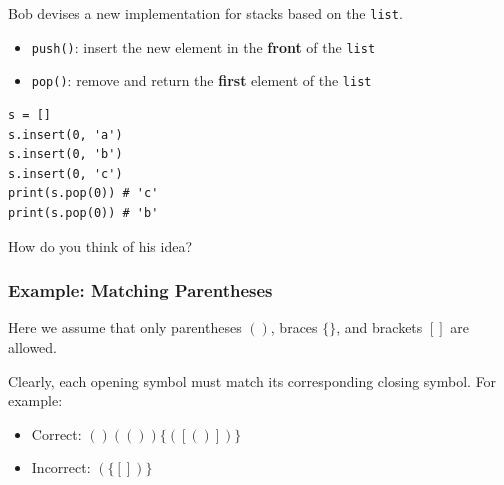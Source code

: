 \documentclass[aspectratio=169, 14pt]{beamer}
\begin{document}
\begin{frame}[fragile]
Bob devises a new implementation for stacks based on the \texttt{list}. 

\begin{itemize}
    \item \texttt{push()}: insert the new element in the \textbf{front} of the \texttt{list}
    \item \texttt{pop()}: remove and return the \textbf{first} element of the \texttt{list}
\end{itemize}

\begin{verbatim}
s = []
s.insert(0, 'a')
s.insert(0, 'b')
s.insert(0, 'c')
print(s.pop(0)) # 'c'
print(s.pop(0)) # 'b'
\end{verbatim}  
    
{\large {}} How do you think of his idea?
\end{frame}

\begin{frame}

\begin{center}
    
\end{center}    

\end{frame}

\begin{frame}
    \frametitle{Example: Matching Parentheses}

    Here we assume that only parentheses $()$, braces $\{\}$, and brackets $[]$ are allowed.

    Clearly, each opening symbol must match its corresponding closing symbol. For example:

    \begin{itemize}
        \item Correct: $()(())\{([()])\}$
        \item Incorrect: $(\{[])\}$
    \end{itemize}

\end{frame}
\end{document}
